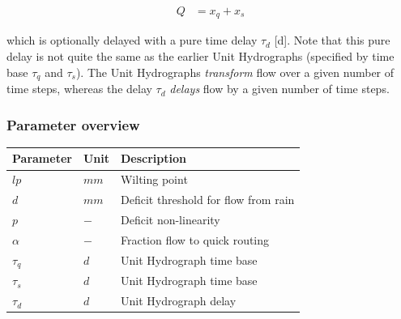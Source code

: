 \begin{align}
	Q &= x_q+x_s
\end{align}

which is optionally delayed with a pure time delay $\tau_d$ [d]. Note that this pure delay is not quite the same as the earlier Unit Hydrographs (specified by time base $\tau_q$ and $\tau_s$). The Unit Hydrographs \emph{transform} flow over a given number of time steps, whereas the delay $\tau_d$ \emph{delays} flow by a given number of time steps.

\subsubsection{Parameter overview}
\begin{table}[htbp]
  \centering
    \begin{tabular}{lll}
    \toprule
    Parameter & Unit  & Description \\
    \midrule
    $lp$  & $mm$  & Wilting point \\
    $d$   & $mm$  & Deficit threshold for flow from rain \\
    $p$   & $-$   & Deficit non-linearity \\
    $\alpha$ & $-$   & Fraction flow to quick routing \\
    $\tau_q$ & $d$   & Unit Hydrograph time base \\
    $\tau_s$ & $d$   & Unit Hydrograph time base \\
    $\tau_d$ & $d$   & Unit Hydrograph delay \\
    \bottomrule
    \end{tabular}%
  \label{tab:addlabel}%
\end{table}%


